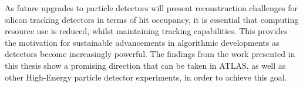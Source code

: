 As future upgrades to particle detectors will present reconstruction challenges for silicon tracking detectors in terms of hit occupancy, it is essential that computing resource use is reduced, whilst maintaining tracking capabilities. This provides the motivation for sustainable advancements in algorithmic developments as detectors become increasingly powerful. The findings from the work presented in this thesis show a promising direction that can be taken in ATLAS, as well as other High-Energy particle detector experiments, in order to achieve this goal. 

